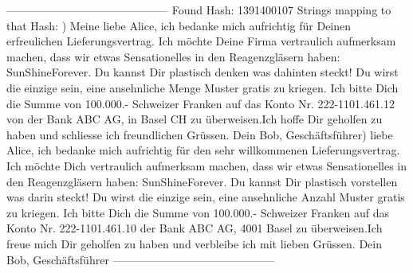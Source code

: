 \documentclass[10pt]{scrartcl}
\begin{document}
--------------------------------------------\newline
Found Hash: 1391400107\newline
Strings mapping to that Hash: ) Meine liebe Alice, ich bedanke mich aufrichtig für Deinen erfreulichen Lieferungsvertrag. Ich möchte Deine Firma vertraulich aufmerksam machen, dass wir etwas Sensationelles in den Reagenzgläsern haben: SunShineForever. Du kannst Dir plastisch denken was dahinten steckt! Du wirst die einzige sein, eine ansehnliche Menge Muster gratis zu kriegen. Ich bitte Dich die Summe von 100.000.- Schweizer Franken auf das Konto Nr. 222-1101.461.12 von der Bank ABC AG, in Basel CH zu überweisen.Ich hoffe Dir geholfen zu haben und schliesse ich freundlichen Grüssen. Dein Bob, Geschäftsführer) liebe Alice, ich bedanke mich aufrichtig für den sehr willkommenen Lieferungsvertrag. Ich möchte Dich vertraulich aufmerksam machen, dass wir etwas Sensationelles in den Reagenzgläsern haben: SunShineForever. Du kannst Dir plastisch vorstellen was darin steckt! Du wirst die einzige sein, eine ansehnliche Anzahl Muster gratis zu kriegen. Ich bitte Dich die Summe von 100.000.- Schweizer Franken auf das Konto Nr. 222-1101.461.10 der  Bank ABC AG, 4001 Basel zu überweisen.Ich freue mich Dir geholfen zu haben und verbleibe ich mit lieben Grüssen. Dein Bob, Geschäftsführer\newline
--------------------------------------------

\end{document}

